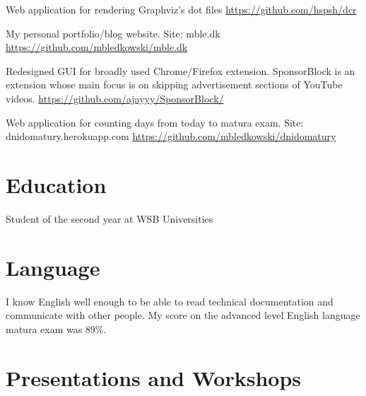 \documentclass[11pt, a4paper, sans, colorlinks]{moderncv}
\begin{document}
{Web application for rendering Graphviz's dot files \href{https://github.com/hspsh/dcr}{https://github.com/hspsh/dcr}}

{My personal portfolio/blog website. Site: mble.dk \href{https://github.com/mbledkowski/mble.dk}{https://github.com/mbledkowski/mble.dk}}

{Redesigned GUI for broadly used Chrome/Firefox extension. SponsorBlock is an extension whose main focus is on skipping advertisement sections of YouTube videos. \href{https://github.com/ajayyy/SponsorBlock}{https://github.com/ajayyy/SponsorBlock/}}

{Web application for counting days from today to matura exam. Site: dnidomatury.herokuapp.com \href{https://github.com/mbledkowski/dnidomatury}{https://github.com/mbledkowski/dnidomatury}}

\section{Education}

{Student of the second year at WSB Universities}

\pagebreak

\section{Language}

{I know English well enough to be able to read technical documentation and communicate with other people. My score on the advanced level English language matura exam was 89\%. }


\section{Presentations and Workshops}
\end{document}
